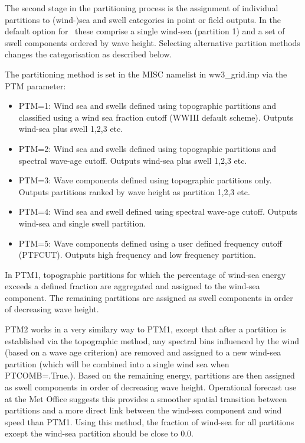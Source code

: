 The second stage in the partitioning process is the assignment of individual
partitions to (wind-)sea and swell categories in point or field outputs. In the
default option for \ws\ these comprise a single wind-sea (partition 1) and a set
of swell components ordered by wave height. Selecting alternative partition methods
changes the categorisation as described below.

The partitioning method is set in the MISC namelist in ww3\_grid.inp via the PTM parameter:
\begin{itemize}

 \item PTM=1: Wind sea and swells defined using topographic partitions and
   		  classified using a wind sea fraction cutoff (WWIII default scheme).
		  Outputs wind-sea plus swell 1,2,3 etc.

 \item PTM=2: Wind sea and swells defined using topographic partitions and
          spectral wave-age cutoff. Outputs wind-sea plus swell 1,2,3 etc.
		  
 \item PTM=3: Wave components defined using topographic partitions only. Outputs partitions
          ranked by wave height as partition 1,2,3 etc.

 \item PTM=4: Wind sea and swell defined using spectral wave-age cutoff. Outputs wind-sea and single swell partition.

 \item PTM=5: Wave components defined using a user defined frequency cutoff (PTFCUT).
        Outputs high frequency and low frequency partition.
\end{itemize}

In PTM1, topographic partitions for which the percentage of wind-sea energy exceeds a 
defined fraction are aggregated and assigned to the wind-sea component. The remaining
partitions are assigned as swell components in order of decreasing wave height.

PTM2 works in a very similary way to PTM1, except that after a partition is
established via the topographic method, any spectral bins influenced by the wind
(based on a wave age criterion) are removed and assigned to a new wind-sea
partition (which will be combined into a single wind sea when PTCOMB=.True.).
Based on the remaining energy, partitions are then assigned as swell components in order
of decreasing wave height. Operational forecast use at the Met Office suggests this
provides a smoother spatial transition between partitions and a more direct link between
the wind-sea component and wind speed than PTM1. Using this method, the fraction of wind-sea
for all partitions except the wind-sea partition should be close to 0.0.

